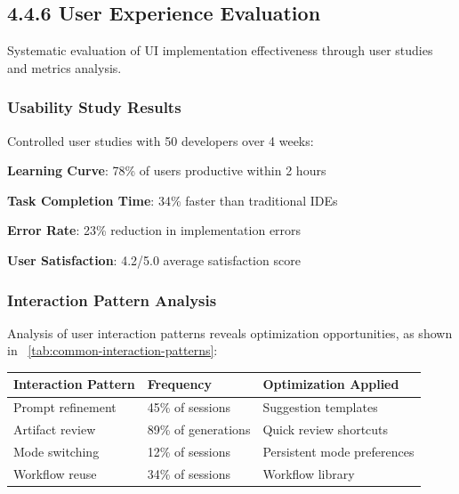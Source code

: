 \subsection*{4.4.6 User Experience Evaluation}
\label{subsec:ux-evaluation}

Systematic evaluation of UI implementation effectiveness through user studies and metrics analysis.

\subsubsection*{Usability Study Results}

Controlled user studies with 50 developers over 4 weeks:

\begin{infobox}[title=Key Usability Findings]
\begin{compactlist}
    \item \textbf{Learning Curve}: 78\% of users productive within 2 hours
    \item \textbf{Task Completion Time}: 34\% faster than traditional IDEs
    \item \textbf{Error Rate}: 23\% reduction in implementation errors
    \item \textbf{User Satisfaction}: 4.2/5.0 average satisfaction score
\end{compactlist}
\end{infobox}

\subsubsection*{Interaction Pattern Analysis}

Analysis of user interaction patterns reveals optimization opportunities, as shown in ~\ref{tab:common-interaction-patterns}:

\begin{center}
\begin{tabular}{@{}lll@{}}
\toprule
\textbf{Interaction Pattern} & \textbf{Frequency} & \textbf{Optimization Applied} \\
\midrule
Prompt refinement & 45\% of sessions & Suggestion templates \\
Artifact review & 89\% of generations & Quick review shortcuts \\
Mode switching & 12\% of sessions & Persistent mode preferences \\
Workflow reuse & 34\% of sessions & Workflow library \\
\bottomrule
\end{tabular}
\label{tab:common-interaction-patterns}
\end{center}

